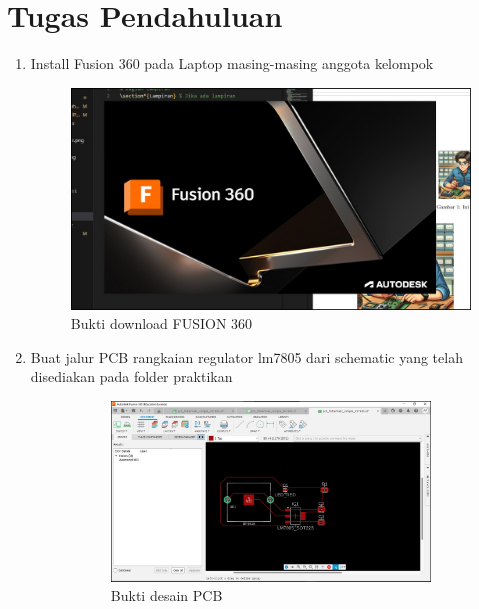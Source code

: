 \section*{Tugas Pendahuluan}
\begin{enumerate}
  \item Install Fusion 360 pada Laptop masing-masing anggota kelompok \\
  \begin{figure}[H]
    \centering
    \includegraphics[width=0.6\linewidth]{img/buktidownloadfusion360.jpg}
    \caption{Bukti download FUSION 360} 
  \end{figure}
  \item Buat jalur PCB rangkaian regulator lm7805 dari schematic yang telah disediakan
  pada folder praktikan \\
  \begin{figure}[H]
    \centering
    \begin{subfigure}[b]{0.45\linewidth}
      \centering
      \includegraphics[width=\linewidth]{img/buatpcb.jpg}
      \caption{Bukti desain PCB\label{fig:inisub1}}
    \end{subfigure}
    \hspace{1cm}
    \begin{subfigure}[b]{0.45\linewidth}

\end{subfigure}
\end{figure}
\end{enumerate}
